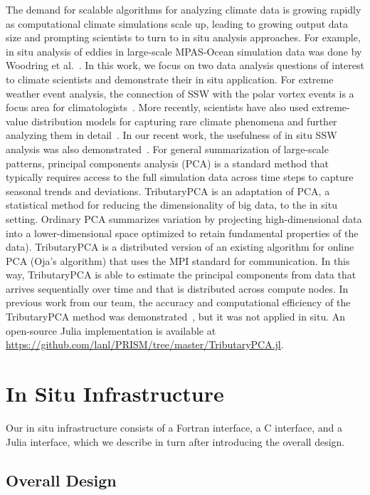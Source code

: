 \documentclass{juliacon}
\begin{document}
The demand for scalable algorithms for analyzing climate data is growing rapidly as computational climate simulations scale up, leading to growing output data size and prompting scientists to turn to in situ analysis approaches. For example, in situ analysis of eddies in large-scale MPAS-Ocean simulation data was done by Woodring et al.~\cite{7192723}. In this work, we focus on two data analysis questions of interest to climate scientists and demonstrate their in situ application. For extreme weather event analysis, the connection of SSW with the polar vortex events is a focus area for climatologists~\cite{ssw_survey}. More recently, scientists have also used extreme-value distribution models for capturing rare climate phenomena and further analyzing them in detail~\cite{gev_huang2016estimating, gev_wang2017detection}. In our recent work, the usefulness of in situ SSW analysis was also demonstrated~\cite{ssw_isav}.
For general summarization of large-scale patterns, principal components analysis (PCA) is a standard method that typically requires access to the full simulation data across time steps to capture seasonal trends and deviations.
TributaryPCA is an adaptation of PCA, a statistical method for reducing the dimensionality of big data, to the in situ setting. Ordinary PCA summarizes variation by projecting high-dimensional data into a lower-dimensional space optimized to retain fundamental properties of the data). TributaryPCA is a distributed version of an existing algorithm for online PCA (Oja's algorithm) that uses the MPI standard for communication. In this way, TributaryPCA is able to estimate the principal components from data that arrives sequentially over time and that is distributed across compute nodes. In previous work from our team, the accuracy and computational efficiency of the TributaryPCA method was demonstrated~\cite{wang2021tributarypca}, but it was not applied in situ. An open-source Julia implementation is available at \url{https://github.com/lanl/PRISM/tree/master/TributaryPCA.jl}.



\section{In Situ Infrastructure}  \label{sec3}
Our in situ infrastructure consists of a Fortran interface, a C interface, and a Julia interface, which we describe in turn after introducing the overall design.

\subsection{Overall Design}
\end{document}
